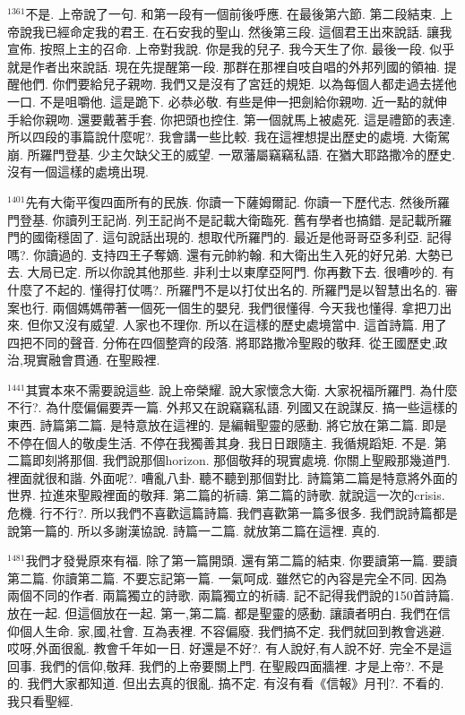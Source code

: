 \documentclass{book}
\begin{document}
$^{1361}$不是.
上帝說了一句.
和第一段有一個前後呼應.
在最後第六節.
第二段結束.
上帝說我已經命定我的君王.
在石安我的聖山.
然後第三段.
這個君王出來說話.
讓我宣佈.
按照上主的召命.
上帝對我說.
你是我的兒子.
我今天生了你.
最後一段.
似乎就是作者出來說話.
現在先提醒第一段.
那群在那裡自吱自唱的外邦列國的領袖.
提醒他們.
你們要給兒子親吻.
我們又是沒有了宮廷的規矩.
以為每個人都走過去搓他一口.
不是咀嚼他.
這是跪下.
必恭必敬.
有些是伸一把劍給你親吻.
近一點的就伸手給你親吻.
還要戴著手套.
你把頭也控住.
第一個就馬上被處死.
這是禮節的表達.
所以四段的事篇說什麼呢?.
我會講一些比較.
我在這裡想提出歷史的處境.
大衛駕崩.
所羅門登基.
少主欠缺父王的威望.
一眾藩屬竊竊私語.
在猶大耶路撒冷的歷史.
沒有一個這樣的處境出現.

$^{1401}$先有大衛平復四面所有的民族.
你讀一下薩姆爾記.
你讀一下歷代志.
然後所羅門登基.
你讀列王記尚.
列王記尚不是記載大衛臨死.
舊有學者也搞錯.
是記載所羅門的國衛穩固了.
這句說話出現的.
想取代所羅門的.
最近是他哥哥亞多利亞.
記得嗎?.
你讀過的.
支持四王子奪嫡.
還有元帥約翰.
和大衛出生入死的好兄弟.
大勢已去.
大局已定.
所以你說其他那些.
非利士以東摩亞阿門.
你再數下去.
很嘈吵的.
有什麼了不起的.
懂得打仗嗎?.
所羅門不是以打仗出名的.
所羅門是以智慧出名的.
審案也行.
兩個媽媽帶著一個死一個生的嬰兒.
我們很懂得.
今天我也懂得.
拿把刀出來.
但你又沒有威望.
人家也不理你.
所以在這樣的歷史處境當中.
這首詩篇.
用了四把不同的聲音.
分佈在四個整齊的段落.
將耶路撒冷聖殿的敬拜.
從王國歷史,政治,現實融會貫通.
在聖殿裡.

$^{1441}$其實本來不需要說這些.
說上帝榮耀.
說大家懷念大衛.
大家祝福所羅門.
為什麼不行?.
為什麼偏偏要弄一篇.
外邦又在說竊竊私語.
列國又在說謀反.
搞一些這樣的東西.
詩篇第二篇.
是特意放在這裡的.
是編輯聖靈的感動.
將它放在第二篇.
即是不停在個人的敬虔生活.
不停在我獨善其身.
我日日跟隨主.
我循規蹈矩.
不是.
第二篇即刻將那個.
我們說那個horizon.
那個敬拜的現實處境.
你關上聖殿那幾道門.
裡面就很和諧.
外面呢?.
嘈亂八卦.
聽不聽到那個對比.
詩篇第二篇是特意將外面的世界.
拉進來聖殿裡面的敬拜.
第二篇的祈禱.
第二篇的詩歌.
就說這一次的crisis.
危機.
行不行?.
所以我們不喜歡這篇詩篇.
我們喜歡第一篇多很多.
我們說詩篇都是說第一篇的.
所以多謝漢協說.
詩篇一二篇.
就放第二篇在這裡.
真的.

$^{1481}$我們才發覺原來有福.
除了第一篇開頭.
還有第二篇的結束.
你要讀第一篇.
要讀第二篇.
你讀第二篇.
不要忘記第一篇.
一氣呵成.
雖然它的內容是完全不同.
因為兩個不同的作者.
兩篇獨立的詩歌.
兩篇獨立的祈禱.
記不記得我們說的150首詩篇.
放在一起.
但這個放在一起.
第一,第二篇.
都是聖靈的感動.
讓讀者明白.
我們在信仰個人生命.
家,國,社會.
互為表裡.
不容偏廢.
我們搞不定.
我們就回到教會逃避.
哎呀,外面很亂.
教會千年如一日.
好還是不好?.
有人說好,有人說不好.
完全不是這回事.
我們的信仰,敬拜.
我們的上帝要關上門.
在聖殿四面牆裡.
才是上帝?.
不是的.
我們大家都知道.
但出去真的很亂.
搞不定.
有沒有看《信報》月刊?.
不看的.
我只看聖經.
\end{document}
